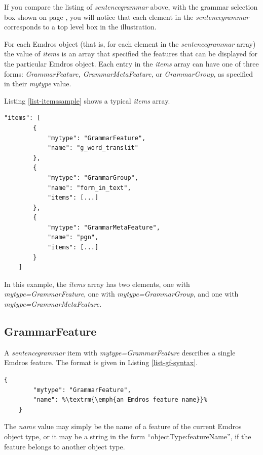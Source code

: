 \documentclass[11pt,oneside,a4paper]{memoir}
\begin{document}
If you compare the listing of \emph{sentencegrammar} above, with the grammar selection box shown on
page \pageref{grammarselect}, you will notice that each element in the \emph{sentencegrammar}
corresponds to a top level box in the illustration.

For each Emdros object (that is, for each element in the \emph{sentencegrammar} array) the value of
\emph{items} is an array that specified the features that can be displayed for the particular Emdros
object. Each entry in the \emph{items} array can have one of three forms: \emph{GrammarFeature,
  GrammarMetaFeature,} or \emph{GrammarGroup}, as specified in their \emph{mytype} value.

Listing \ref{list-itemssample} shows a typical \emph{items} array.

\begin{lstlisting}[caption=A sample items value,label=list-itemssample]
    "items": [
        {
            "mytype": "GrammarFeature",
            "name": "g_word_translit"
        },
        {
            "mytype": "GrammarGroup",
            "name": "form_in_text",
            "items": [...]
        },
        {
            "mytype": "GrammarMetaFeature",
            "name": "pgn",
            "items": [...]
        }
    ]
\end{lstlisting}

In this example, the \emph{items} array has two elements, one with \emph{mytype=GrammarFeature},
one with \emph{mytype=GrammarGroup}, and one with \emph{mytype=GrammarMetaFeature.}

\subsection{GrammarFeature}\label{sec-grammarfeature}

A \emph{sentencegrammar} item with \emph{mytype=GrammarFeature} describes a single Emdros
feature. The format is given in Listing \ref{list-gf-syntax}.

\begin{lstlisting}[caption=GrammarFeature syntax,label=list-gf-syntax]
    {
        "mytype": "GrammarFeature",
        "name": %\textrm{\emph{an Emdros feature name}}%
    }
\end{lstlisting}

The \emph{name} value may simply be the name of a feature of the current Emdros object type, or it
may be a string in the form ``objectType:featureName'', if the feature belongs to another object type.
\end{document}
